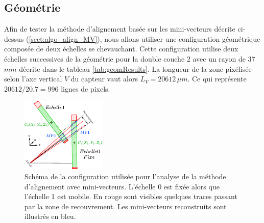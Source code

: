  
   
   
  \subsection{G\'eom\'etrie}
  \label{sect:Align_MV_Geom}
  
   Afin de tester la m\'ethode d'alignement bas\'ee sur les mini-vecteurs d\'ecrite ci-dessus (\ref{sect:algo_align_MV}), nous allons utiliser une configuration g\'eom\'etrique compos\'ee de deux \'echelles se chevauchant. Cette configuration utilise deux \'echelles successives de la g\'eom\'etrie pour la double couche 2 avec un rayon de 37 $mm$ d\'ecrite dans le tableau \ref{tab:geomResults}. La longueur de la zone pix\'elis\'ee selon l'axe vertical $V$ du capteur vaut alors $L_V = 20612 \, \mu m$. Ce qui repr\'esente $20612/20.7 = 996$ lignes de pixels. 
  
  \begin{figure}[!htb]
    \begin{center}
      \includegraphics[scale=3.5]{./figures/Geometry_2_DoubleSided_Ladders.pdf}
      \caption{Sch\'ema de la configuration utilis\'ee pour l'analyse de la m\'ethode d'alignement avec mini-vecteurs. L'\'echelle 0 est fix\'ee alors que l'\'echelle 1 est mobile. En rouge sont visibles quelques traces passant par la zone de recouvrement. Les mini-vecteurs reconstruits sont illustr\'es en bleu.}
      \label{fig:schema_config_mv}
    \end{center}
  \end{figure}


